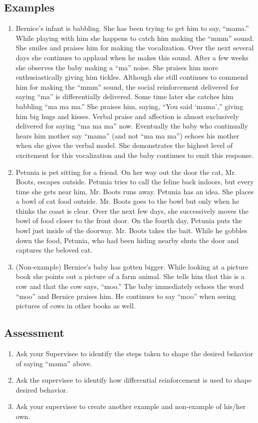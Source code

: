 \subsection{Examples}
\begin{enumerate}
\item Bernice's infant is babbling. She has been trying to get him to say, ``mama.'' While playing with him she happens to catch him making the ``mmm'' sound. She smiles and praises him for making the vocalization. Over the next several days she continues to applaud when he makes this sound.  After a few weeks she observes the baby making a ``ma'' noise.  She praises him more enthusiastically giving him tickles. Although she still continues to commend him for making the ``mmm'' sound, the social reinforcement delivered for saying ``ma'' is differentially delivered.  Some time later she catches him babbling ``ma ma ma.''  She praises him, saying, ``You said ‘mama','' giving him big hugs and kisses. Verbal praise and affection is almost exclusively delivered for saying ``ma ma ma'' now. Eventually the baby who continually hears him mother say ``mama'' (and not ``ma ma ma'') echoes his mother when she gives the verbal model.  She demonstrates the highest level of excitement for this vocalization and the baby continues to emit this response.  
\item Petunia is pet sitting for a friend.  On her way out the door the cat, Mr. Boots, escapes outside.  Petunia tries to call the feline back indoors, but every time she gets near him, Mr. Boots runs away.  Petunia has an idea.  She places a bowl of cat food outside.  Mr. Boots goes to the bowl but only when he thinks the coast is clear.  Over the next few days, she successively moves the bowl of food closer to the front door.  On the fourth day, Petunia puts the bowl just inside of the doorway.  Mr. Boots takes the bait.  While he gobbles down the food, Petunia, who had been hiding nearby shuts the door and captures the beloved cat.  
\item (Non-example) Bernice's baby has gotten bigger.  While looking at a picture book she points out a picture of a farm animal.  She tells him that this is a cow and that the cow says, ``moo.'' The baby immediately echoes the word ``moo'' and Bernice praises him.  He continues to say ``moo'' when seeing pictures of cows in other books as well.
\end{enumerate}
% 
\subsection{Assessment}
\begin{enumerate}
\item Ask your Supervisee to identify the steps taken to shape the desired behavior of saying ``mama'' above. 
\item Ask the supervisee to identify how differential reinforcement is used to shape desired behavior.  
\item Ask your supervisee to create another example and non-example of his/her own. 
\end{enumerate}
%
